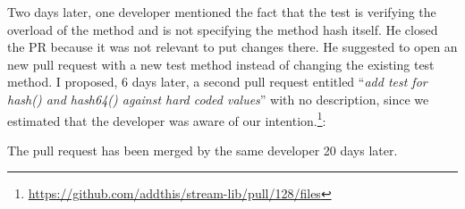 Two days later, one developer mentioned the fact that the test is verifying the overload of the method and is not specifying the method hash itself. 
He closed the PR because it was not relevant to put changes there. 
He suggested to open an new pull request with a new test method instead of changing the existing test method. 
I proposed, 6 days later, a second pull request entitled ``\emph{add test for hash() and hash64() against hard coded values}'' with no description, since we estimated that the developer was aware of our intention.\footnote{\url{https://github.com/addthis/stream-lib/pull/128/files}}:
\begin{figure}[H]
	\centering{}
\end{figure}

The pull request has been merged by the same developer 20 days later.


